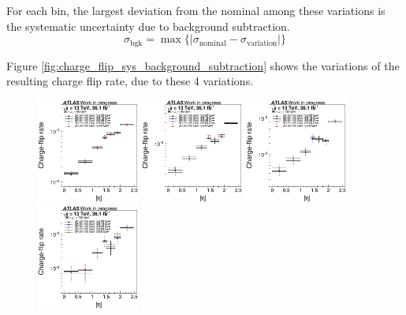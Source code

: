 For each bin, the largest deviation from the nominal among these variations is the systematic uncertainty due to background subtraction.
\begin{equation}
\sigma_{\text{bgk}} = \max \{| \sigma_{\text{nominal}} - \sigma_{\text{variation}} |\}
\end{equation}

Figure \ref{fig:charge_flip_sys_background_subtraction} shows the variations of the resulting charge flip rate, due to these 4 variations.
\begin{figure}
\centering
\includegraphics[width=0.3\textwidth]{data/plot/charge_flip/FitPlots/data_cf_comparison_0.eps}
\includegraphics[width=0.3\textwidth]{data/plot/charge_flip/FitPlots/data_cf_comparison_1.eps}
\includegraphics[width=0.3\textwidth]{data/plot/charge_flip/FitPlots/data_cf_comparison_2.eps} \\
\includegraphics[width=0.3\textwidth]{data/plot/charge_flip/FitPlots/data_cf_comparison_3.eps}

\end{figure}
